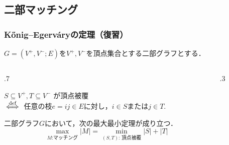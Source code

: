 \documentclass[14pt,aspectratio=169,xcolor=dvipsnames,table,onlytextwidth,dvipdfmx]{beamer}
\begin{document}
\subsection{二部マッチング}

\begin{frame}
    \frametitle{K\H{o}nig--Egerv\'aryの定理（復習）}
    \small

    $G = (V^+, V^-; E)$を$V^+, V^-$を頂点集合とする二部グラフとする．

    \begin{columns}[T]
    \begin{column}{.7\textwidth}
    \begin{definition}
        $S \subseteq V^+, T \subseteq V^-$ が\alert{頂点被覆} \\
        $\overset{\text{def}}{\iff}$ 任意の枝$e = ij \in E$に対し，$i \in S$または$j \in T$.
    \end{definition}
    \bigskip
    \begin{theorem}
        二部グラフ$G$において，次の最大最小定理が成り立つ．
        \[
            \max_{\text{$M$:マッチング}} |M| = \min_{\text{$(S,T)$: 頂点被覆}} |S| + |T|
        \]
    \end{theorem}
    \end{column}
    \begin{column}{.3\textwidth}
        \centering
    \end{column}
    \end{columns}

\end{frame}
\end{document}
